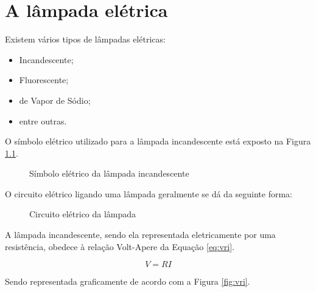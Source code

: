\chapter{A lâmpada elétrica}
\label{sec:alampada}

Existem vários tipos de lâmpadas elétricas:
\begin{itemize}
\item Incandescente;
\item Fluorescente;
\item de Vapor de Sódio;
\item entre outras. %
\end{itemize}

O símbolo elétrico utilizado para a lâmpada incandescente está
exposto na Figura \ref{fig:simbolo_lampada}.

\begin{figure}[!htb]
\centering
{}
\caption{Símbolo elétrico da lâmpada incandescente}
\label{fig:simbolo_lampada}
\end{figure}

O circuito elétrico ligando uma lâmpada geralmente se dá da
seguinte forma:

\begin{figure}[!htb]
\centering
{}
\caption{Circuito elétrico da lâmpada}
\label{fig:circuito_lampada}
\end{figure}

A lâmpada incandescente, sendo ela representada eletricamente por
uma resistência, obedece à relação Volt-Apere da Equação \ref{eq:vri}.

\begin{equation}
\label{eq:vri}
V=R I
\end{equation}

Sendo representada graficamente de acordo com a Figura \ref{fig:vri}.

